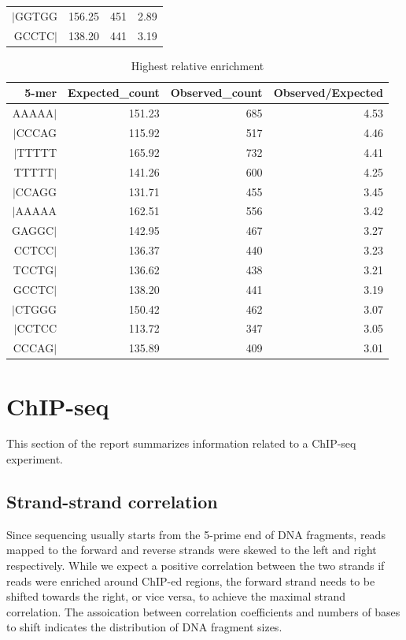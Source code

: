 \documentclass{article}
\begin{document}
\begin{center}
{\begin{longtable}{|r|r|r|r|}
  $|$GGTGG & 156.25 & 451 & 2.89 \\ 
   \rowcolor[gray]{0.9}GCCTC$|$ & 138.20 & 441 & 3.19 \\ 
   \hline
\hline
\end{longtable}
}%
{\scriptsize
\begin{longtable}{|r|r|r|r|}
\caption{Highest relative enrichment} \\ 
  \hline
5-mer & Expected\_count & Observed\_count & Observed/Expected \\ 
  \hline
AAAAA$|$ & 151.23 & 685 & 4.53 \\ 
   \rowcolor[gray]{0.9}$|$CCCAG & 115.92 & 517 & 4.46 \\ 
  $|$TTTTT & 165.92 & 732 & 4.41 \\ 
   \rowcolor[gray]{0.9}TTTTT$|$ & 141.26 & 600 & 4.25 \\ 
  $|$CCAGG & 131.71 & 455 & 3.45 \\ 
   \rowcolor[gray]{0.9}$|$AAAAA & 162.51 & 556 & 3.42 \\ 
  GAGGC$|$ & 142.95 & 467 & 3.27 \\ 
   \rowcolor[gray]{0.9}CCTCC$|$ & 136.37 & 440 & 3.23 \\ 
  TCCTG$|$ & 136.62 & 438 & 3.21 \\ 
   \rowcolor[gray]{0.9}GCCTC$|$ & 138.20 & 441 & 3.19 \\ 
  $|$CTGGG & 150.42 & 462 & 3.07 \\ 
   \rowcolor[gray]{0.9}$|$CCTCC & 113.72 & 347 & 3.05 \\ 
  CCCAG$|$ & 135.89 & 409 & 3.01 \\ 
   \hline
\hline
\end{longtable}
}\end{center}
\newpage

\section{ChIP-seq}
This section of the report summarizes information related to a ChIP-seq experiment. 


\subsection{Strand-strand correlation}
Since sequencing usually starts from the 5-prime end of DNA fragments, reads mapped to the forward and reverse strands were skewed to the left and right respectively. While we expect a positive correlation between the two strands if reads were enriched around ChIP-ed regions, the forward strand needs to be shifted towards the right, or vice versa, to achieve the maximal strand correlation. The assoication between correlation coefficients and numbers of bases to shift indicates the distribution of DNA fragment sizes.
\end{document}
